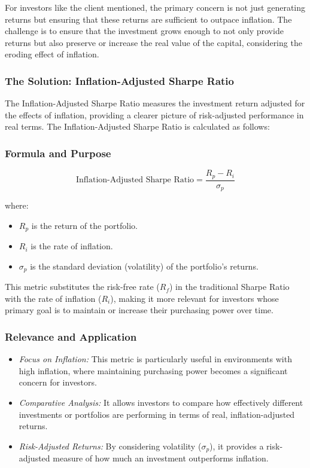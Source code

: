 \documentclass{article}
\begin{document}
For investors like the client mentioned, the primary concern is not just generating returns but ensuring that these returns are sufficient to outpace inflation. The challenge is to ensure that the investment grows enough to not only provide returns but also preserve or increase the real value of the capital, considering the eroding effect of inflation. \\

\subsubsection{The Solution: Inflation-Adjusted Sharpe Ratio}

The Inflation-Adjusted Sharpe Ratio measures the investment return adjusted for the effects of inflation, providing a clearer picture of risk-adjusted performance in real terms. The Inflation-Adjusted Sharpe Ratio is calculated as follows:

\subsubsection{Formula and Purpose}

\begin{equation}
    \text{Inflation-Adjusted Sharpe Ratio} = \frac{R_p - R_i}{\sigma_p}
\end{equation}

where:
\begin{itemize}
    \item \( R_p \) is the return of the portfolio.
    \item \( R_i \) is the rate of inflation.
    \item \( \sigma_p \) is the standard deviation (volatility) of the portfolio’s returns.
\end{itemize}

This metric substitutes the risk-free rate (\( R_f \)) in the traditional Sharpe Ratio with the rate of inflation (\( R_i \)), making it more relevant for investors whose primary goal is to maintain or increase their purchasing power over time.

\subsubsection{Relevance and Application}

\begin{itemize}
    \item \textit{Focus on Inflation:} This metric is particularly useful in environments with high inflation, where maintaining purchasing power becomes a significant concern for investors.
    \item \textit{Comparative Analysis:} It allows investors to compare how effectively different investments or portfolios are performing in terms of real, inflation-adjusted returns.
    \item \textit{Risk-Adjusted Returns:} By considering volatility (\( \sigma_p \)), it provides a risk-adjusted measure of how much an investment outperforms inflation.
\end{itemize}
\end{document}
